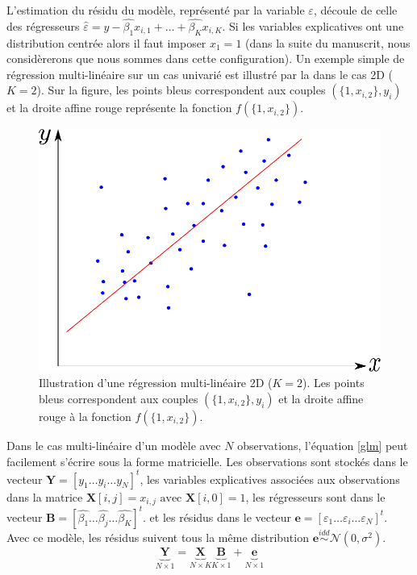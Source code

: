 L'estimation du résidu du modèle, représenté par la variable $\varepsilon$, 
découle de celle des régresseurs $\hat{\varepsilon} = y - \hat{\beta_{1}}x_{i,1} + \dots + \hat{\beta_{K}}x_{i,K} $.
Si les variables explicatives ont une distribution centrée alors il faut imposer $x_{1} = 1$ 
(dans la suite du manuscrit, nous considèrerons que nous sommes dans cette configuration).
Un exemple simple de régression multi-linéaire sur un cas univarié
est illustré par la  dans le cas 2D ($K=2$).
Sur la figure, les points bleus correspondent aux couples $(\{1, x_{i,2}\},y_i)$ et la droite affine rouge représente la fonction $f(\{1, x_{i,2}\})$.\\
\begin{figure}[ht]
    \centering
    \includegraphics[scale=0.5]{Images/regression_2d.pdf}
    \caption{\label{regression_2D} Illustration d'une régression multi-linéaire 2D ($K=2$). 
    Les points bleus correspondent aux couples $(\{1, x_{i,2}\} ,y_i)$ et la droite affine rouge à la fonction $f(\{1, x_{i,2}\})$.}
\end{figure}

Dans le cas multi-linéaire d'un modèle avec $N$ observations,
l'équation \eqref{glm} peut facilement s'écrire sous la forme matricielle.
Les observations sont stockés dans le vecteur $\mathbf{Y} = \left[y_1\dots y_i\dots y_N\right]^{t}$, 
les variables explicatives associées aux observations dans la matrice $\mathbf{X}\left[i,j\right] = x_{i,j} \mbox{ avec } \mathbf{X}\left[i,0\right] = 1$,
les régresseurs sont dans le vecteur $\mathbf{B} =\left[\hat{\beta_{1}}\dots \hat{\beta_j}\dots \hat{\beta_K}\right]^{t}$.
et les résidus dans le vecteur $\mathbf{e} = \left[\varepsilon_1\dots \varepsilon_i\dots \varepsilon_N\right]^{t}$. 
Avec ce modèle, les résidus suivent tous la même distribution $\mathbf{e} \overset{idd}{\sim} \mathcal{N}(0, \sigma^2)$.
\begin{equation}
    \underbrace{\mathbf{Y}}_{N\times 1} = 
	      \underbrace{\mathbf{X}}_{N\times K}\underbrace{\mathbf{B}}_{K\times 1} + \underbrace{\mathbf{e}}_{N\times 1}
    \label{glm_mat}
\end{equation}

